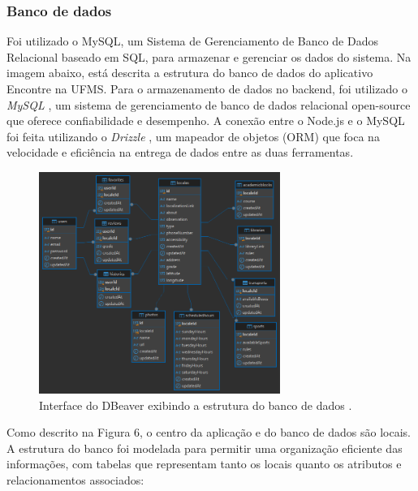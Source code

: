 \subsubsection{Banco de dados}
    
    Foi utilizado o MySQL, um Sistema de Gerenciamento de Banco de Dados Relacional baseado em SQL, para armazenar e gerenciar os dados do sistema.  Na imagem abaixo, está descrita a estrutura do banco de dados do aplicativo Encontre na UFMS.
    Para o armazenamento de dados no backend, foi utilizado o \textit{MySQL} \cite{mysql}, um sistema de gerenciamento de banco de dados relacional open-source que oferece confiabilidade e desempenho. A conexão entre o Node.js e o MySQL foi feita utilizando o \textit{Drizzle} \cite{drizzle}, um mapeador de objetos (ORM) que foca na velocidade e eficiência na entrega de dados entre as duas ferramentas.

\begin{figure}[h]
    \centering
    \includegraphics[width=0.7\textwidth]{imagens/encontrenaufms.png}
    \caption{\scriptsize Interface do DBeaver exibindo a estrutura do banco de dados \cite{dbeaver}.}
    \label{fig:descricaoBancoDeDados}
\end{figure}

    Como descrito na Figura 6, o centro da aplicação e do banco de dados são locais. A estrutura do banco foi modelada para permitir uma organização eficiente das informações, com tabelas que representam tanto os locais quanto os atributos e relacionamentos associados:

